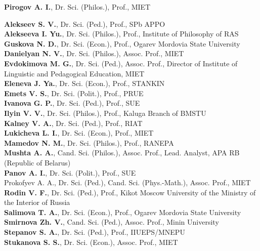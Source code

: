 \begin{otherlanguage}{english}
\begin{minipage}[t]{.48\textwidth}
\begin{flushleft}
\textbf{Pirogov A. I.}, Dr. Sci. (Philos.), Prof., MIET

\vspace{1em}
\textbf{Alekseev S. V.}, Dr. Sci. (Ped.), Prof., SPb APPO\\
\textbf{Alekseeva I. Yu.}, Dr. Sci. (Philos.), Prof.,
        Institute of Philosophy of RAS\\
        \textbf{Guskova N. D.}, Dr. Sci. (Econ.), Prof.,
        Ogarev Mordovia State University\\
        \textbf{Danielyan N. V.}, Dr. Sci. (Philos.), Assoc. Prof., MIET\\
        \textbf{Evdokimova M. G.}, Dr. Sci. (Ped.), Assoc. Prof., Director
        of Institute of Linguistic and Pedagogical Education,
        MIET\\
        \textbf{Eleneva J. Ya.}, Dr. Sci. (Econ.), Prof., STANKIN\\
        \textbf{Emets V. S.}, Dr. Sci. (Polit.), Prof., PRUE\\
        \textbf{Ivanova G. P.}, Dr. Sci. (Ped.), Prof., SUE\\
        \textbf{Ilyin V. V.}, Dr. Sci. (Philos.), Prof.,
        Kaluga Branch of BMSTU\\
        \textbf{Kalney V. A.}, Dr. Sci. (Ped.), Prof., RIAT\\
        \textbf{Lukicheva L. I.}, Dr. Sci. (Econ.), Prof., MIET\\
        \textbf{Mamedov N. M.}, Dr. Sci. (Philos.), Prof., RANEPA\\
        \textbf{Mushta A. A.}, Cand. Sci. (Philos.), Assoc. Prof.,
        Lead. Analyst, APA RB (Republic of Belarus)\\
        \textbf{Panov A. I.}, Dr. Sci. (Polit.), Prof., SUE\\
        {Prokofyev A. A.}, Dr. Sci. (Ped.), Cand. Sci. (Phys.-Math.),
        Assoc. Prof., MIET\\
        \textbf{Rodin V. F.}, Dr. Sci. (Ped.), Prof., Kikot Moscow University
        of the Ministry of the Interior of Russia\\
        \textbf{Salimova T. A.}, Dr. Sci. (Econ.), Prof.,
        Ogarev Mordovia State University\\
        \textbf{Smirnova Zh. V.}, Cand. Sci. (Ped.), Assoc. Prof.,
        Minin University\\
        \textbf{Stepanov S. A.}, Dr. Sci. (Ped.), Prof., IIUEPS/MNEPU\\
        \textbf{Stukanova S. S.}, Dr. Sci. (Econ.), Assoc. Prof., MIET
\end{flushleft}
\end{minipage}


\end{otherlanguage}

